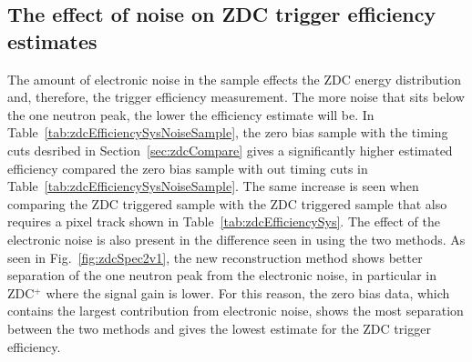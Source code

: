     \subsection{The effect of noise on ZDC trigger efficiency estimates}
      The amount of electronic noise in the sample effects the ZDC energy 
        distribution and, therefore, the trigger efficiency measurement.
      The more noise that sits below the one neutron peak, the lower the 
        efficiency estimate will be. 
      In Table~\ref{tab:zdcEfficiencySysNoiseSample}, the zero bias sample 
        with the timing cuts desribed in Section~\ref{sec:zdcCompare} gives a 
        significantly higher
        estimated efficiency compared the zero bias sample with out timing cuts
        in Table~\ref{tab:zdcEfficiencySysNoiseSample}.
      The same increase is seen when comparing the ZDC triggered sample with 
        the ZDC triggered sample that also requires a pixel track shown in
        Table~\ref{tab:zdcEfficiencySys}. 
      The effect of the electronic noise is also present in the difference seen
        in using the two methods.
      As seen in Fig.~\ref{fig:zdcSpec2v1}, the new reconstruction method 
        shows better separation of the one neutron peak from the electronic 
        noise, in particular in ZDC$^{+}$ where the signal gain is lower.
      For this reason, the zero bias data, which contains the largest 
        contribution from electronic noise, shows the most separation between 
        the two methods and gives the lowest estimate for the ZDC trigger 
        efficiency.
